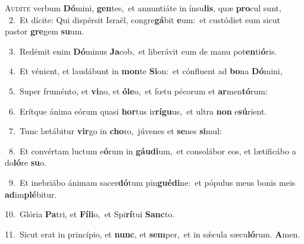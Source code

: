 \lettrine{\initial\textcolor{\initialcolor}{A}}{udíte} verbum \textbf{Dó}\-mini, \textbf{gen}\-tes,~\star et annuntiáte in ínsu\-\textbf{lis}\-, quæ \textbf{pro}\-cul sunt,\\
{\numbfont\textcolor{\numbcolor}{~2.}}~Et dícite: Qui dispérsit Israël, congre\-\textbf{gá}\-bit \textbf{e}\-um:~\star et custódiet eum sicut pastor \textbf{gre}\-gem \textbf{su}\-um.\par
{\numbfont\textcolor{\numbcolor}{~3.}}~Redémit enim \textbf{Dó}\-minus \textbf{Ja}\-cob,~\star et liberávit eum de manu pot\-\textbf{en}\-ti\-\textbf{ó}\-ris.\par
{\numbfont\textcolor{\numbcolor}{~4.}}~Et vénient, et laudábunt in \textbf{mon}\-te \textbf{Si}\-on:~\star et cónfluent ad \textbf{bo}\-na \textbf{Dó}\-mini,\par
{\numbfont\textcolor{\numbcolor}{~5.}}~Super fruménto, et \textbf{vi}\-no, et \textbf{ó}\-\textbf{le}o,~\star et fœtu pécorum et \textbf{ar}\-men\-\textbf{tó}\-rum:\par
{\numbfont\textcolor{\numbcolor}{~6.}}~Erítque ánima eórum quasi \textbf{hor}\-tus ir\-\textbf{rí}\-\textbf{gu}us,~\star et ultra \textbf{non} e\-\textbf{sú}\-rient.\par
{\numbfont\textcolor{\numbcolor}{~7.}}~Tunc lætábitur \textbf{vir}\-go in \textbf{cho}\-ro,~\star júvenes et \textbf{se}\-nes \textbf{si}\-mul:\par
{\numbfont\textcolor{\numbcolor}{~8.}}~Et convértam luctum e\-\textbf{ó}\-rum in \textbf{gáu}\-\textbf{di}um,~\star et consolábor eos, et lætificábo a do\-\textbf{ló}\-re \textbf{su}\-o.\par
{\numbfont\textcolor{\numbcolor}{~9.}}~Et inebriábo ánimam sacer\-\textbf{dó}\-tum pin\-\textbf{gué}\-\textbf{di}ne:~\star et pópulus meus bonis meis \textbf{ad}\-im\-\textbf{plé}\-bitur.\par
{\numbfont\textcolor{\numbcolor}{10.}}~Glória \textbf{Pa}\-tri, et \textbf{Fí}\-\textbf{li}o,~\star et Spi\-\textbf{rí}\-tui \textbf{Sanc}\-to.\par
{\numbfont\textcolor{\numbcolor}{11.}}~Sicut erat in princípio, et \textbf{nunc}\-, et \textbf{sem}\-per,~\star et in sǽcula sæcu\-\textbf{ló}\-rum. \textbf{A}\-men.\par
